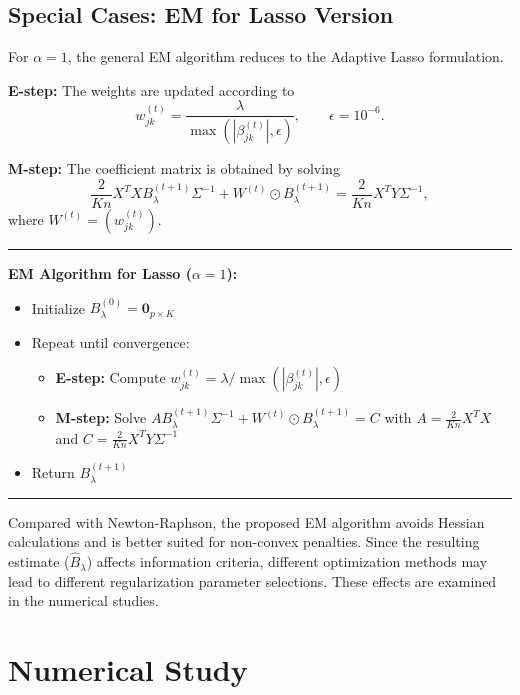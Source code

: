 \documentclass[twoside]{article}
\begin{document}
\subsection{Special Cases: EM for Lasso Version}
For \(\alpha = 1\), the general EM algorithm reduces to the Adaptive Lasso formulation.



\textbf{E-step:} The weights are updated according to
$$
w_{jk}^{(t)}
=
\frac{\lambda}
{\max\!\left(|\beta_{jk}^{(t)}|,\epsilon\right)},
\qquad
\epsilon = 10^{-6}.
$$



\textbf{M-step:} The coefficient matrix is obtained by solving
$$
\frac{2}{Kn}X^TX B_\lambda^{(t+1)}\Sigma^{-1}
+
W^{(t)} \odot B_\lambda^{(t+1)}
=
\frac{2}{Kn}X^TY\Sigma^{-1},
$$
where \(W^{(t)}=(w_{jk}^{(t)})\).  \\



{ \linespread{0.5} \hrule
	\begin{alg}\label{alg2}
\textbf{EM Algorithm for Lasso (\(\alpha = 1\)):}
\begin{itemize}
	\item Initialize \(B_\lambda^{(0)} = \mathbf{0}_{p \times K}\)
	\item Repeat until convergence:
	\begin{itemize}
		\item \textbf{E-step:} Compute \(w_{jk}^{(t)} = \lambda / \max(|\beta_{jk}^{(t)}|, \epsilon)\)
		\item \textbf{M-step:} Solve \(A B_\lambda^{(t+1)} \Sigma^{-1} + W^{(t)} \odot B_\lambda^{(t+1)} = C\) with \(A = \frac{2}{Kn} X^T X\) and \(C = \frac{2}{Kn} X^T Y \Sigma^{-1}\)
	\end{itemize}
	\item Return \(B_\lambda^{(t+1)}\)
\end{itemize} \end{alg} \hrule}
\vspace{0.2cm}
Compared with Newton-Raphson, the proposed EM algorithm avoids Hessian calculations and is better suited for non-convex penalties. Since the resulting estimate ($ \hat{B}_{\lambda} $) affects information criteria, different optimization methods may lead to different regularization parameter selections. These effects are examined in the numerical studies.





\section{Numerical Study}
\end{document}
